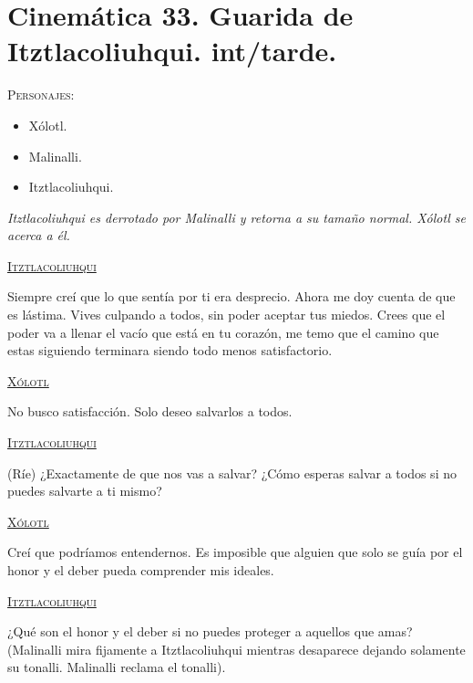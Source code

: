 \section{Cinemática 33. Guarida de Itztlacoliuhqui. int/tarde.} \label{Cin:Cinematica33}
 \textsc{Personajes}:
 \begin{itemize}
 \item Xólotl.
 \item Malinalli.
 \item Itztlacoliuhqui.
 \end{itemize}
\textit{Itztlacoliuhqui es derrotado por Malinalli y retorna a su tamaño normal. Xólotl se acerca a él.}
\begin{center}
\textsc{\underline{Itztlacoliuhqui}}
\\
\par
Siempre creí que lo que sentía por ti era desprecio. Ahora me doy cuenta de que es lástima. Vives culpando a todos, sin poder aceptar tus miedos. Crees que el poder va a llenar el vacío que está en tu corazón, me temo que el camino que estas siguiendo terminara siendo todo menos satisfactorio.
\\
\par
\textsc{\underline{Xólotl}}
\\
\par
No busco satisfacción. Solo deseo salvarlos a todos.
\\
\par
\textsc{\underline{Itztlacoliuhqui}}
\\
\par
(Ríe) ¿Exactamente de que nos vas a salvar? ¿Cómo esperas salvar a todos si no puedes salvarte a ti mismo?
\\
\par
\textsc{\underline{Xólotl}}
\\
\par
Creí que podríamos entendernos. Es imposible que alguien que solo se guía por el honor y el deber pueda comprender mis ideales.
\\
\par
\textsc{\underline{Itztlacoliuhqui}}
\\
\par
¿Qué son el honor y el deber si no puedes proteger a aquellos que amas? (Malinalli mira fijamente a Itztlacoliuhqui mientras desaparece dejando solamente su tonalli. Malinalli reclama el tonalli).
\end{center}